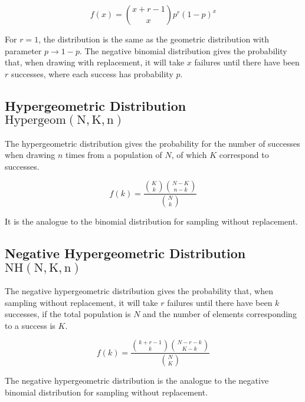 \begin{equation}
f(x) = {x+r-1\choose x} p^r (1-p)^x
\end{equation} 

For $r=1$, the distribution is the same as the geometric distribution with parameter $p\rightarrow 1-p$. The negative binomial distribution gives the probability that, when drawing with replacement, it will take $x$ failures until there have been $r$ successes, where each success has probability $p$.


\subsection{Hypergeometric Distribution $\mathrm{Hypergeom(N,K,n)}$}
The hypergeometric distribution gives the probability for the number of successes when drawing $n$ times from a population of $N$, of which $K$ correspond to successes.

\begin{equation}
f(k) = \frac{{K \choose k}{ N-K \choose n-k}}{{N \choose k}}
\end{equation} 

It is the analogue to the binomial distribution for sampling without replacement.

\subsection{Negative Hypergeometric Distribution $\mathrm{NH(N,K,n)}$}
The negative hypergeometric distribution gives the probability that, when sampling without replacement, it will take $r$ failures until there have been $k$ successes, if the total population is $N$ and the number of elements corresponding to a success is $K$.

\begin{equation}
f(k) = \frac{{k+r-1\choose k}{N-r-k \choose K-k}}{{N\choose K}}
\end{equation}

The negative hypergeometric distribution is the analogue to the negative binomial distribution for sampling without replacement. 


